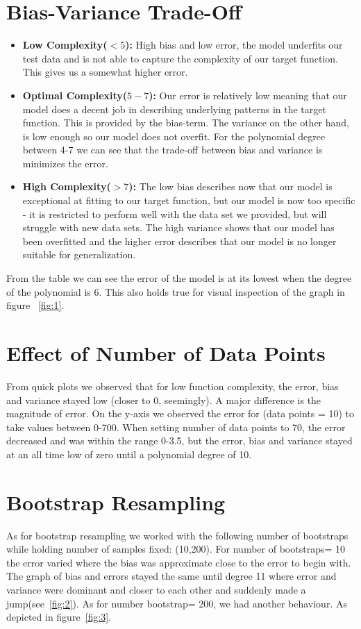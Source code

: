 \newpage
\section{Bias-Variance Trade-Off}
%
\begin{itemize}
    \item \textbf{Low Complexity($<5$):} High bias and low error, the model underfits our test data and is not able to capture the complexity of our target function. This gives us a somewhat higher error.
    \item \textbf{Optimal Complexity($5-7$):} Our error is relatively low meaning that our model does a decent job in describing underlying patterns in the target function. This is provided by the bias-term. The variance on the other hand, is low enough so our model does not overfit. For the polynomial degree between 4-7 we can see that the trade-off between bias and variance is minimizes the error.
    \item \textbf{High Complexity($>7$):} The low bias describes now that our model is exceptional at fitting to our target function, but our model is now too specific - it is restricted to perform well with the data set we provided, but will struggle with new data sets. The high variance shows that our model has been overfitted and the higher error describes that our model is no longer suitable for generalization.
\end{itemize}
%
From the table we can see the error of the model is at its lowest when the degree of the polynomial is 6. This also holds true for visual inspection of the graph in figure ~\ref{fig:1}.

\section{Effect of Number of Data Points}

\hfill\break
From quick plots we observed that for low function complexity, the error, bias and variance stayed low (closer to $0$, seemingly). A major difference is the magnitude of error. On the y-axis we observed the error for (data points = 10) to take values between 0-700. When setting number of data points to 70, the error decreased and was within the range 0-3.5, but the error, bias and variance stayed at an all time low of zero until a polynomial degree of 10.

\section{Bootstrap Resampling}
As for bootstrap resampling we worked with the following number of bootstraps while holding number of samples fixed: (10,200).
For number of bootstraps= 10 the error varied where the bias was approximate close to the error to begin with. The graph of bias and errors stayed the same until degree 11 where error and variance were dominant and closer to each other and suddenly made a jump(see~\ref{fig:2}).
As for number bootstrap= 200, we had another behaviour. As depicted in figure~\ref{fig:3}.

